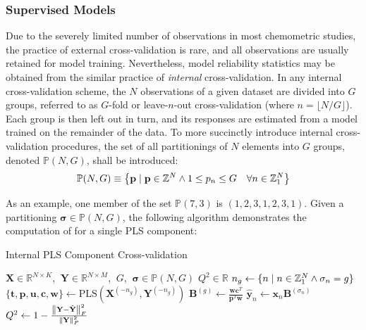 \subsubsection{Supervised Models}

\begin{doublespace}
Due to the severely limited number of observations in most chemometric studies,
the practice of external cross-validation is rare, and all observations are
usually retained for model training. Nevertheless, model reliability statistics
may be obtained from the similar practice of \emph{internal} cross-validation.
In any internal cross-validation scheme, the $N$ observations of a given
dataset are divided into $G$ groups, referred to as $G$-fold or
leave-$n$-out cross-validation (where $n = \lfloor N / G \rfloor$). Each
group is then left out in turn, and its responses are estimated from a model
trained on the remainder of the data. To more succinctly introduce internal
cross-validation procedures, the set of all partitionings of $N$ elements into
$G$ groups, denoted $\mathbb{P}(N, G)$, shall be introduced:
\begin{equation}
\mathbb{P}(N, G) \equiv \big\{
 \mathbf{p} \mid \mathbf{p} \in \mathbb{Z}^N
 \wedge
 1 \le p_n \le G
 \quad \forall n \in \mathbb{Z}_{1}^{N}
\big\}
\end{equation}

As an example, one member of the set $\mathbb{P}(7, 3)$ is $(1,2,3,1,2,3,1)$.
Given a partitioning $\boldsymbol{\sigma} \in \mathbb{P}(N, G)$, the following
algorithm demonstrates the computation of \qsq{} for a single PLS component:
\end{doublespace}

\begin{algorithm}[H]
\caption{Internal PLS Component Cross-validation}
\label{algorithm.3.8}
\begin{algorithmic}[1]
\REQUIRE $\mathbf{X} \in \mathbb{R}^{N \times K}$,%
       $\:\mathbf{Y} \in \mathbb{R}^{N \times M}$,%
       $\:G$, $\:\boldsymbol{\sigma} \in \mathbb{P}(N, G)$
\ENSURE $Q^2 \in \mathbb{R}$
  \STATE $n_g \gets \{ n \mid n \in \mathbb{Z}_{1}^{N} \wedge \sigma_n = g \}$
  \STATE $\{\mathbf{t}, \mathbf{p}, \mathbf{u}, \mathbf{c}, \mathbf{w}\}
          \gets \mathrm{PLS}(\mathbf{X}^{(-n_g)},
                             \mathbf{Y}^{(-n_g)})$ 
  \STATE $\mathbf{B}^{(g)} \gets \tfrac{\mathbf{w} \mathbf{c}^T}
                                       {\mathbf{p}^T \mathbf{w}}$
\ENDFOR
{}
  \STATE $\hat{\mathbf{y}}_n \gets
          \mathbf{x}_n \mathbf{B}^{(\sigma_n)}$ 
\ENDFOR
\STATE $Q^2 \gets 1 - \frac{\left\| \mathbf{Y} - \hat{\mathbf{Y}} \right\|_F^2}
                           {\left\| \mathbf{Y} \right\|_F^2}$
\end{algorithmic}
\end{algorithm}


